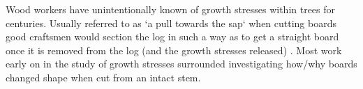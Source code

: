 Wood workers have unintentionally known of growth stresses within trees
for centuries. Usually referred to as `a pull towards the sap` when cutting boards good
craftsmen would section the log in such a way as to get a straight board once it
is removed from the log (and the growth stresses released) \cite{jacobs1945l}. Most work early on in
the study of growth stresses surrounded investigating how/why boards changed
shape when cut from an intact stem.